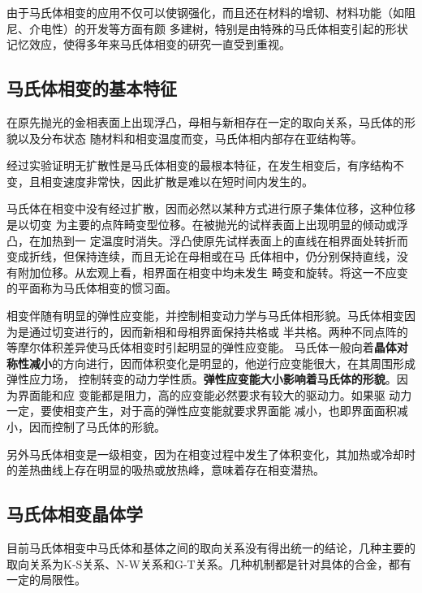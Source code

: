         由于马氏体相变的应用不仅可以使钢强化，而且还在材料的增韧、材料功能（如阻尼、介电性）的开发等方面有颇
        多建树，特别是由特殊的马氏体相变引起的形状记忆效应，使得多年来马氏体相变的研究一直受到重视。

        \subsection{马氏体相变的基本特征}
            在原先抛光的金相表面上出现浮凸，母相与新相存在一定的取向关系，马氏体的形貌以及分布状态
            随材料和相变温度而变，马氏体相内部存在亚结构等。

            经过实验证明无扩散性是马氏体相变的最根本特征，在发生相变后，有序结构不变，且相变速度非常快，因此扩散是难以在短时间内发生的。

            马氏体在相变中没有经过扩散，因而必然以某种方式进行原子集体位移，这种位移是以切变
            为主要的点阵畸变型位移。在被抛光的试样表面上出现明显的倾动或浮凸，在加热到一
            定温度时消失。浮凸使原先试样表面上的直线在相界面处转折而变成折线，但保持连续，而且无论在母相或在马
            氏体相中，仍分别保持直线，没有附加位移。从宏观上看，相界面在相变中均未发生
            畸变和旋转。将这一不应变的平面称为马氏体相变的惯习面。

            相变伴随有明显的弹性应变能，并控制相变动力学与马氏体相形貌。马氏体相变因为是通过切变进行的，因而新相和母相界面保持共格或
            半共格。两种不同点阵的等摩尔体积差异使马氏体相变时引起明显的弹性应变能。
            马氏体一般向着\textbf{晶体对称性减小}的方向进行，因而体积变化是明显的，他逆行应变能很大，在其周围形成弹性应力场，
            控制转变的动力学性质。\textbf{弹性应变能大小影响着马氏体的形貌}。因为界面能和应
            变能都是阻力，高的应变能必然要求有较大的驱动力。如果驱
            动力一定，要使相变产生，对于高的弹性应变能就要求界面能
            减小，也即界面面积减小，因而控制了马氏体的形貌。

            另外马氏体相变是一级相变，因为在相变过程中发生了体积变化，其加热或冷却时
            的差热曲线上存在明显的吸热或放热峰，意味着存在相变潜热。
        \subsection{马氏体相变晶体学}
            目前马氏体相变中马氏体和基体之间的取向关系没有得出统一的结论，几种主要的
            取向关系为K-S关系、N-W关系和G-T关系。几种机制都是针对具体的合金，都有一定的局限性。
